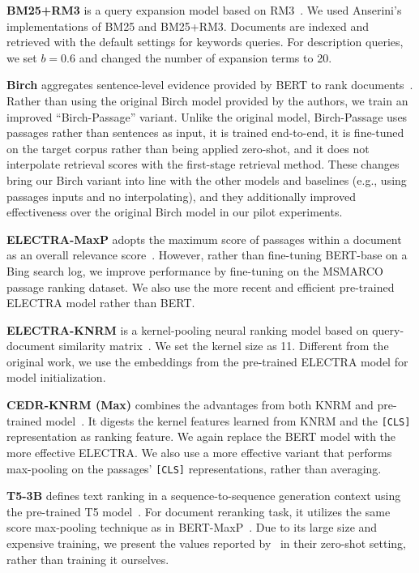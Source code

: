 {\bf BM25+RM3} is a query expansion model based on RM3~\cite{DBLP:conf/sigir/LavrenkoC01}.
We used Anserini's~\cite{DBLP:journals/jdiq/YangFL18} implementations of BM25 and BM25+RM3.
Documents are indexed and retrieved with the default settings for keywords queries.
For description queries, we set $b=0.6$ and changed the number of expansion terms to 20.


{\bf Birch} 
aggregates sentence-level evidence provided by BERT to rank documents~\cite{DBLP:conf/emnlp/YilmazWYZL19}.
Rather than using the original Birch model provided by the authors, we train an improved ``Birch-Passage'' variant.
Unlike the original model, Birch-Passage uses passages rather than sentences as input, it is trained end-to-end, it is fine-tuned on the target corpus rather than being applied zero-shot, and it does not interpolate retrieval scores with the first-stage retrieval method.
These changes bring our Birch variant into line with the other models and baselines (e.g., using passages inputs and no interpolating), and they additionally improved effectiveness over the original Birch model in our pilot experiments.

{\bf ELECTRA-MaxP}
adopts the maximum score of passages within a document as an overall relevance score~\cite{DBLP:conf/sigir/DaiC19}.
However, rather than fine-tuning BERT-base on a Bing search log, we improve performance by fine-tuning on the MSMARCO passage ranking dataset.
We also use the more recent and efficient pre-trained ELECTRA model rather than BERT.

{\bf ELECTRA-KNRM} 
is a kernel-pooling neural ranking model based on query-document similarity matrix~\cite{DBLP:conf/sigir/XiongDCLP17}.
We set the kernel size as 11.
Different from the original work, we use the embeddings from the pre-trained ELECTRA model for model initialization.

{\bf CEDR-KNRM (Max)}
combines the advantages from both KNRM and pre-trained model~\cite{DBLP:conf/sigir/MacAvaneyYCG19}.
It digests the kernel features learned from KNRM and the \texttt{[CLS]} representation as ranking feature. We again replace the BERT model with the more effective ELECTRA.
We also use a more effective variant that performs max-pooling on the passages' \texttt{[CLS]} representations, rather than averaging.

{\bf T5-3B}
defines text ranking in a sequence-to-sequence generation context using the pre-trained T5 model~\cite{DBLP:journals/corr/abs-2003-06713}.
For document reranking task, it utilizes the same score max-pooling technique as in BERT-MaxP~\cite{DBLP:conf/sigir/DaiC19}. Due to its large size and expensive training, we present the values reported by~\cite{DBLP:journals/corr/abs-2003-06713} in their zero-shot setting, rather than training it ourselves.

